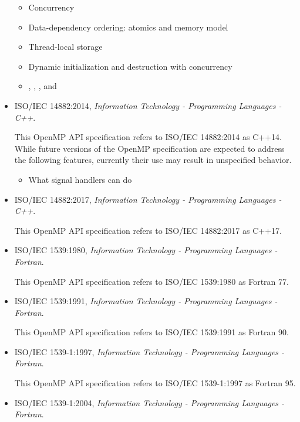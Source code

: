 \begin{itemize}
\begin{itemize}
\item Concurrency
\item Data-dependency ordering: atomics and memory model
\item Thread-local storage
\item Dynamic initialization and destruction with concurrency
\item {}, , ,
   and 
\end{itemize}

\item ISO/IEC 14882:2014, \textsl{Information Technology - Programming Languages - C++}.

This OpenMP API specification refers to ISO/IEC 14882:2014 as C++14. 
While future versions of the OpenMP specification are expected to
address the following features, currently their use may result in
unspecified behavior.

\begin{itemize}
\item What signal handlers can do
\end{itemize}

\item ISO/IEC 14882:2017, \textsl{Information Technology - Programming Languages - C++}.

This OpenMP API specification refers to ISO/IEC 14882:2017 as
C++17. 

\item ISO/IEC 1539:1980, \textsl{Information Technology - Programming Languages - Fortran}.

This OpenMP API specification refers to ISO/IEC 1539:1980 as Fortran 77.

\item ISO/IEC 1539:1991, \textsl{Information Technology - Programming Languages - Fortran}.

This OpenMP API specification refers to ISO/IEC 1539:1991 as Fortran 90.

\item ISO/IEC 1539-1:1997, \textsl{Information Technology - Programming Languages - Fortran}.

This OpenMP API specification refers to ISO/IEC 1539-1:1997 as Fortran 95.

\item ISO/IEC 1539-1:2004, \textsl{Information Technology - Programming Languages - Fortran}.


\end{itemize}
